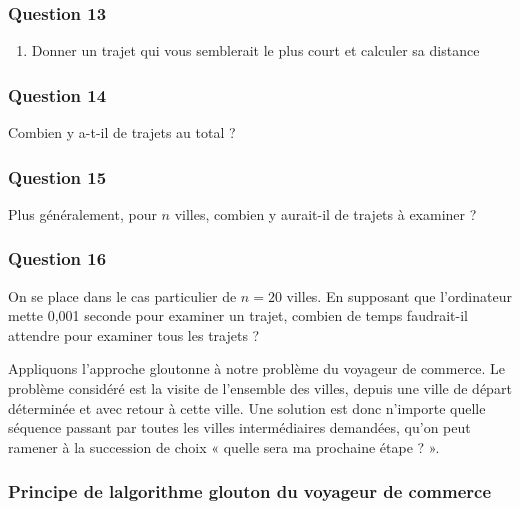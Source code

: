 \documentclass[
  paper=a4,
  ,captions=tableheading
]{scrartcl}
\providecommand{\tightlist}{%
  \setlength{\itemsep}{0pt}\setlength{\parskip}{0pt}}
\begin{document}
\hypertarget{question-13}{%
\subsubsection{Question 13}\label{question-13}}

\begin{enumerate}
\tightlist
\item
  Donner un trajet qui vous semblerait le plus court et calculer sa
  distance
\end{enumerate}

\hypertarget{question-14}{%
\subsubsection{Question 14}\label{question-14}}

Combien y a-t-il de trajets au total ?

\hypertarget{question-15}{%
\subsubsection{Question 15}\label{question-15}}

Plus généralement, pour \(n\) villes, combien y aurait-il de trajets à
examiner ?

\hypertarget{question-16}{%
\subsubsection{Question 16}\label{question-16}}

On se place dans le cas particulier de \(n=20\) villes. En supposant que
l'ordinateur mette 0,001 seconde pour examiner un trajet, combien de
temps faudrait-il attendre pour examiner tous les trajets ?

Appliquons l'approche gloutonne à notre problème du voyageur de
commerce. Le problème considéré est la visite de l'ensemble des villes,
depuis une ville de départ déterminée et avec retour à cette ville. Une
solution est donc n'importe quelle séquence passant par toutes les
villes intermédiaires demandées, qu'on peut ramener à la succession de
choix « quelle sera ma prochaine étape ? ».

\hypertarget{principe-de-lalgorithme-glouton-du-voyageur-de-commerce}{%
\subsubsection{Principe de l\textquotesingle algorithme glouton du
voyageur de
commerce}\label{principe-de-lalgorithme-glouton-du-voyageur-de-commerce}}
\end{document}
